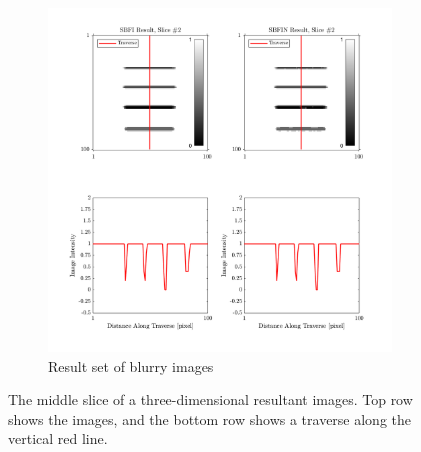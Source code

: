 \documentclass[usletter, 11pt, titlepage]{article}
\begin{document}
\begin{figure}[!h]
\begin{subfigure}[b]{0.5\textwidth}
            \includegraphics[width=\textwidth]{HessianResultsSBFI_N.png}
            \caption{Result set of blurry images}
            \label{fig:Blurry images result}
    \end{subfigure}
    \caption{The middle slice of a three-dimensional resultant images. Top row shows the images, and the bottom row shows a traverse along the vertical red line. }
    \label{fig:Results}
\end{figure}
\end{document}
